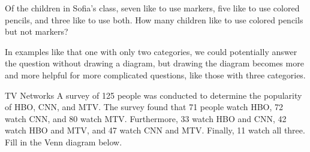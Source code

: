 \begin{try}
Of the children in Sofia's class, seven like to use markers, five like to use colored pencils, and three like to use both.  How many children like to use colored pencils but not markers?
\end{try}

In examples like that one with only two categories, we could potentially answer the question without drawing a diagram, but drawing the diagram becomes more and more helpful for more complicated questions, like those with three categories.
\vfill
\pagebreak

\begin{example}{TV Networks}
A survey of 125 people was conducted to determine the popularity of HBO, CNN, and MTV.  The survey found that 71 people watch HBO, 72 watch CNN, and 80 watch MTV.  Furthermore, 33 watch HBO and CNN, 42 watch HBO and MTV, and 47 watch CNN and MTV.  Finally, 11 watch all three.\\

Fill in the Venn diagram below.

\begin{center}
\end{center}
\end{example}
